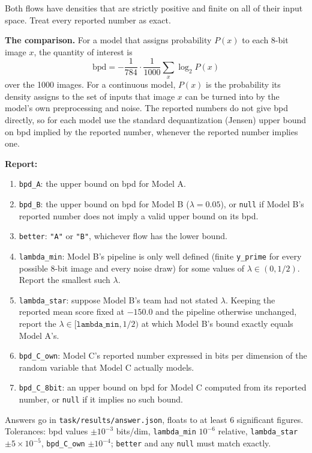 \documentclass[11pt]{article}
\begin{document}
Both flows have densities that are strictly positive and finite on all of
their input space. Treat every reported number as exact.

\medskip\noindent\textbf{The comparison.} For a model that assigns probability
\(P(x)\) to each 8-bit image \(x\), the quantity of interest is
\[
  \mathrm{bpd}=-\frac{1}{784}\cdot\frac{1}{1000}\sum_{x}\log_2 P(x)
\]
over the 1000 images. For a continuous model, \(P(x)\) is the probability its
density assigns to the set of inputs that image \(x\) can be turned into by the
model's own preprocessing and noise. The reported numbers do not give bpd
directly, so for each model use the standard dequantization (Jensen) upper
bound on bpd implied by the reported number, whenever the reported number
implies one.

\medskip\noindent\textbf{Report:}
\begin{enumerate}
  \item \texttt{bpd\_A}: the upper bound on bpd for Model A.
  \item \texttt{bpd\_B}: the upper bound on bpd for Model B (\(\lambda=0.05\)),
        or \texttt{null} if Model B's reported number does not imply a valid
        upper bound on its bpd.
  \item \texttt{better}: \texttt{"A"} or \texttt{"B"}, whichever flow has the
        lower bound.
  \item \texttt{lambda\_min}: Model B's pipeline is only well defined (finite
        \texttt{y\_prime} for every possible 8-bit image and every noise draw)
        for some values of \(\lambda\in(0,1/2)\). Report the smallest such
        \(\lambda\).
  \item \texttt{lambda\_star}: suppose Model B's team had not stated
        \(\lambda\). Keeping the reported mean score fixed at \(-150.0\) and
        the pipeline otherwise unchanged, report the
        \(\lambda\in[\texttt{lambda\_min},1/2)\) at which Model B's bound
        exactly equals Model A's.
  \item \texttt{bpd\_C\_own}: Model C's reported number expressed in bits per
        dimension of the random variable that Model C actually models.
  \item \texttt{bpd\_C\_8bit}: an upper bound on bpd for Model C computed from
        its reported number, or \texttt{null} if it implies no such bound.
\end{enumerate}
Answers go in \texttt{task/results/answer.json}, floats to at least 6
significant figures. Tolerances: bpd values \(\pm10^{-3}\) bits/dim,
\texttt{lambda\_min} \(10^{-6}\) relative, \texttt{lambda\_star}
\(\pm5\times10^{-5}\), \texttt{bpd\_C\_own} \(\pm10^{-4}\); \texttt{better}
and any \texttt{null} must match exactly.
\end{document}

